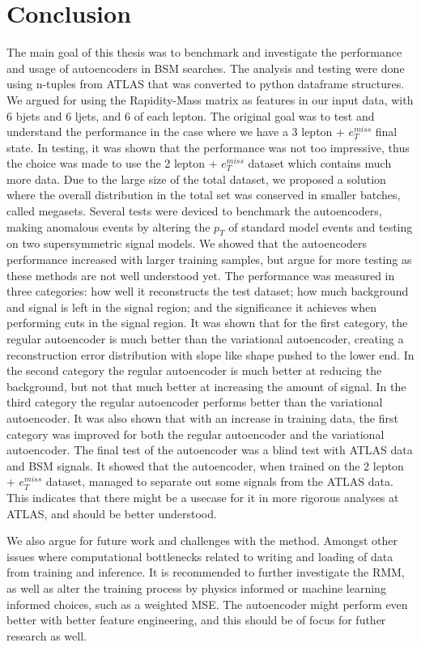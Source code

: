 \chapter{Conclusion}


The main goal of this thesis was to benchmark and investigate the performance and usage of
autoencoders in BSM searches. The analysis and testing were done using 
n-tuples from ATLAS that was converted to python dataframe structures. We argued for using 
the Rapidity-Mass matrix as features in our input data, with 6 bjets and 6 ljets, and 6 
of each lepton. The original goal was to test and understand the performance in the case
where we have a 3 lepton + $e_T^{miss}$ final state. In testing, it was shown that the 
performance was not too impressive, thus the choice was made to use the 2 lepton + $e_T^{miss}$ dataset which 
contains much more data. Due to the large size of the total dataset, we proposed a solution
where the overall distribution in the total set was conserved in smaller batches, called 
megasets. Several tests were deviced to benchmark the autoencoders, 
making anomalous events by altering the $p_T$ of standard model events and testing on two 
supersymmetric signal models. We showed that the autoencoders performance increased with 
larger training samples, but argue for more testing as these methods are not well 
understood yet. The performance was measured in three categories: how well it reconstructs 
the test dataset; how much background and signal is left in the signal region; and 
the significance it achieves when performing cuts in the signal region. It was shown that
for the first category, the regular autoencoder is much better than the variational autoencoder, 
creating a reconstruction error distribution with slope like shape pushed to the lower end. 
In the second category the regular autoencoder is much better at 
reducing the background, but not that much better at increasing the amount of signal. In the 
third category the regular autoencoder performs better than the variational autoencoder. 
It was also shown that with an increase in training data, the first category was improved 
for both the regular autoencoder and the variational autoencoder. The final test of the autoencoder 
was a blind test with ATLAS data and BSM signals. It showed that the autoencoder, when trained on 
the 2 lepton + $e_T^{miss}$ dataset, managed to separate out some signals from the ATLAS data. 
This indicates that there might be a usecase for it in more rigorous analyses at ATLAS, and 
should be better understood. \par 
We also argue for future work and challenges with the method. Amongst other 
issues where computational bottlenecks related to writing and loading of data from training 
and inference. It is recommended to further investigate the RMM, as well as alter 
the training process by physics informed or machine learning informed choices, such as a 
weighted MSE. The autoencoder might perform even better with better feature engineering, and 
this should be of focus for futher research as well. 